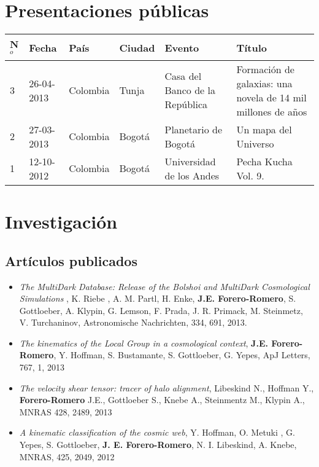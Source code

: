 \documentclass{article}
\begin{document}
\section*{Presentaciones p\'ublicas}

\begin{tabular}{lp{2.0cm} p{1.2cm} p{1.5cm} p{2cm} p{5cm}}\hline
N$^{o}$ & Fecha & Pa\'is & Ciudad & Evento & T\'itulo\\\hline
3 & 26-04-2013 & Colombia & Tunja & Casa del Banco de la Rep\'ublica &
Formaci\'on de galaxias: una novela de 14 mil millones de a\~nos\\  
2 & 27-03-2013 & Colombia & Bogot\'a & Planetario de Bogot\'a & Un mapa del
Universo\\
1 & 12-10-2012 & Colombia & Bogot\'a & Universidad de los Andes & Pecha
Kucha Vol. 9.\\ \hline
\end{tabular}

\section*{Investigaci\'on}

\subsection*{Art\'iculos publicados}

\begin{itemize}
\item {\it The MultiDark Database: Release of the Bolshoi and MultiDark Cosmological Simulations} , K. Riebe , A. M. Partl, H. Enke, {\bf J.E. Forero-Romero}, S. Gottloeber, A. Klypin, G. Lemson, F. Prada, J. R. Primack, M. Steinmetz, V. Turchaninov, Astronomische Nachrichten, 334, 691, 2013.

\item {\it The kinematics of the Local Group in a cosmological context}, 
{\bf J.E. Forero-Romero}, Y. Hoffman, S. Bustamante, S. Gottloeber, G. Yepes, ApJ Letters, 767, 1, 2013

\item {\it The velocity shear tensor: tracer of halo alignment}, Libeskind N., Hoffman Y., {\bf Forero-Romero} J.E., Gottloeber S., Knebe A., Steinmentz M., Klypin A., MNRAS 428, 2489, 2013

\item {\it A kinematic classification of the cosmic web}, Y. Hoffman, O. Metuki , G. Yepes, S. Gottloeber, {\bf J. E. Forero-Romero}, N. I. Libeskind, A. Knebe, MNRAS, 425, 2049, 2012
\end{itemize}
\end{document}
